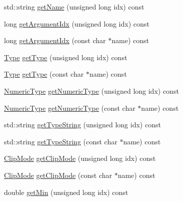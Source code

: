 \begin{DoxyCompactItemize}
\item 
std\+::string \hyperlink{class_frame_lib___parameters_a525cfe083e686bc5de04aee1004f3bfe}{get\+Name} (unsigned long idx) const
\item 
long \hyperlink{class_frame_lib___parameters_a9dd267fcd72252b366d7f0fd5112e668}{get\+Argument\+Idx} (unsigned long idx) const
\item 
long \hyperlink{class_frame_lib___parameters_a91ad76185df1c37e58f18cb7fc81c140}{get\+Argument\+Idx} (const char $\ast$name) const
\item 
\hyperlink{class_frame_lib___parameters_a01bd45aaa25fa8cfaec369e2c8a8371a}{Type} \hyperlink{class_frame_lib___parameters_ae81f3bf43c6301b1abadd5b2539f8925}{get\+Type} (unsigned long idx) const
\item 
\hyperlink{class_frame_lib___parameters_a01bd45aaa25fa8cfaec369e2c8a8371a}{Type} \hyperlink{class_frame_lib___parameters_a705bba592b790d1b884b2ea4dd4bdbd4}{get\+Type} (const char $\ast$name) const
\item 
\hyperlink{class_frame_lib___parameters_a61fa243341eccefa66dbb744b7e047a0}{Numeric\+Type} \hyperlink{class_frame_lib___parameters_a57052803e8a3ab34c40bf4dedd33e196}{get\+Numeric\+Type} (unsigned long idx) const
\item 
\hyperlink{class_frame_lib___parameters_a61fa243341eccefa66dbb744b7e047a0}{Numeric\+Type} \hyperlink{class_frame_lib___parameters_a7d9b774329a6e87643a6714913687cfe}{get\+Numeric\+Type} (const char $\ast$name) const
\item 
std\+::string \hyperlink{class_frame_lib___parameters_a75457679ab4b67d5d438bf8619544d94}{get\+Type\+String} (unsigned long idx) const
\item 
std\+::string \hyperlink{class_frame_lib___parameters_a7531a5e8e9ea19a84dd8314ed2ebe4f3}{get\+Type\+String} (const char $\ast$name) const
\item 
\hyperlink{class_frame_lib___parameters_afcefd8a6a664599b93f635538d95265a}{Clip\+Mode} \hyperlink{class_frame_lib___parameters_ac574f7fd7e17b4d5df393c84b81b4431}{get\+Clip\+Mode} (unsigned long idx) const
\item 
\hyperlink{class_frame_lib___parameters_afcefd8a6a664599b93f635538d95265a}{Clip\+Mode} \hyperlink{class_frame_lib___parameters_ab54fc0edf6fed7029dec5dd09f884b38}{get\+Clip\+Mode} (const char $\ast$name) const
\item 
double \hyperlink{class_frame_lib___parameters_af73a52dd8beadde0c65159fd2d8d35ce}{get\+Min} (unsigned long idx) const
\item 

\end{DoxyCompactItemize}
